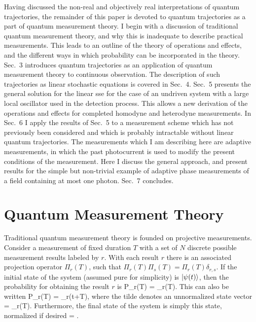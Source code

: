 Having discussed the non-real and objectively real interpretations of quantum
trajectories, the remainder of this paper is devoted to quantum trajectories as
a part of quantum measurement theory. I begin with a discussion of traditional
quantum measurement theory, and why this is inadequate to describe practical
measurements. This leads to an outline of the theory of operations and effects,
and the different ways in which probability can be incorporated in the theory.
Sec.~3 introduces quantum trajectories as an application of quantum measurement
theory to continuous observation. The description of such trajectories as linear
stochastic \sch equations is covered in Sec.~4. Sec.~5 presents the general
solution for the linear {\sc sse} for the case of an undriven system with a large local
oscillator used in the detection process. This allows a new derivation of the
operations and effects for completed homodyne and heterodyne measurements. In
Sec.~6 I apply the results of Sec.~5 to a measurement scheme which has not
previously been considered and which is probably intractable without linear
quantum trajectories. The measurements which I am describing here are adaptive
measurements, in which the past photocurrent is used to modify the present
conditions of the measurement. 
Here I discuss the general approach, and present results for the simple but
non-trivial example of adaptive phase measurements of a field containing at most
one photon. Sec.~7 concludes.

\section{Quantum Measurement Theory}

Traditional quantum measurement theory is founded on projective measurements.
Consider a measurement of fixed duration $T$ with a set of $N$ discrete possible
measurement results labeled by $r$. With each result $r$ there is an
associated projection operator $\Pi_r(T)$, such that
$\Pi_r(T)\Pi_s(T)=\Pi_r(T)\delta_{r,s}$. If the initial state of the system
(assumed pure for simplicity) is $| {\psi(t)} \rangle$, then the probability for
obtaining the result $r$ is \beq
P_r(T) = \Pi_r(T).
\eeq
This can also be written
\beq
P_r(T) = \tilde{\psi}_r(t+T)\rangle,
\eeq
where the tilde denotes an unnormalized state vector
\beq
{} = \Pi_r(T).
\eeq
Furthermore, the final state of the system is simply this state, normalized if
desired 
\beq
{} = .
\eeq

